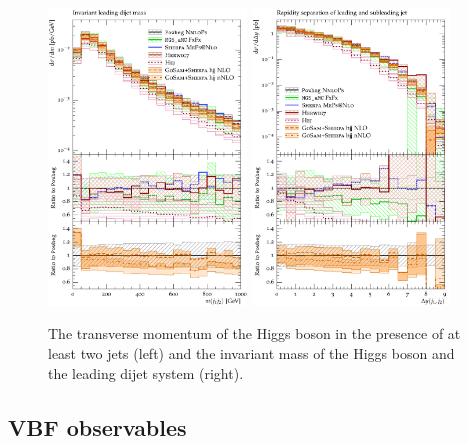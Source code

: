\begin{figure}[t!]
  \centering
  \includegraphics[width=0.47\textwidth]{figures/hjetscomp_dijet_mass.pdf}
  \quad
  \includegraphics[width=0.47\textwidth]{figures/hjetscomp_deltay_jj.pdf}
  \caption{
    The transverse momentum of the Higgs boson in the 
    presence of at least two jets (left) and the invariant mass of the 
    Higgs boson and the leading dijet system (right).
    \label{fig:higgscomp:results:2obs:mjj_dyjj}
  }
\end{figure}

\subsection{VBF observables}
\label{sec:hjetscomp:results:VBFobs}

